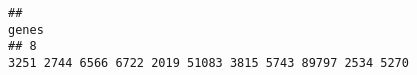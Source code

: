 \documentclass{article}\usepackage[]{graphicx}\usepackage[]{color}
\makeatletter
\newenvironment{kframe}{%
 \def\at@end@of@kframe{}%
 \ifinner\ifhmode%
  \def\at@end@of@kframe{\end{minipage}}%
  \begin{minipage}{\columnwidth}%
 \fi\fi%
 \def\FrameCommand##1{\hskip\@totalleftmargin \hskip-\fboxsep
 \colorbox{shadecolor}{##1}\hskip-\fboxsep
     \hskip-\linewidth \hskip-\@totalleftmargin \hskip\columnwidth}%
 \MakeFramed {\advance\hsize-\width
   \@totalleftmargin\z@ \linewidth\hsize
   \@setminipage}}%
 {\par\unskip\endMakeFramed%
 \at@end@of@kframe}
\newenvironment{knitrout}{}{} %
\makeatother
\begin{document}
\begin{knitrout}
\begin{kframe}
\begin{verbatim}
##                                                                                                                                                                                                                                                                                                                                                                                                                                                                                                                                                                                                                                                                                                                                                                                                                                                                                                                                                                                                                                                                                                                                                                                                                                                                                                                                                                                                                                                                                             genes
## 8                                                                                                                                                                                                                                                                                                                                                                                                                                                                                                                                                                                                                                                                                                                                                                                                                                                                                                                                                                                                                                                                                                                                                                                                                                                                                                                                                                                                                                        3251 2744 6566 6722 2019 51083 3815 5743 89797 2534 5270

\end{verbatim}
\end{kframe}
\end{knitrout}
\end{document}
